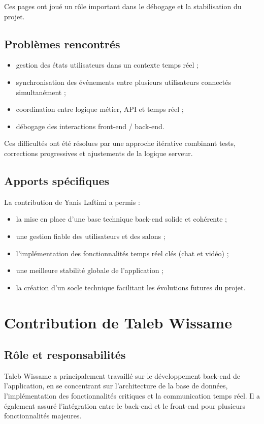 \documentclass[12pt,a4paper]{report}
\begin{document}
Ces pages ont joué un rôle important dans le débogage et la stabilisation du projet.

\subsection*{Problèmes rencontrés}

\begin{itemize}
  \item gestion des états utilisateurs dans un contexte temps réel ;
  \item synchronisation des événements entre plusieurs utilisateurs connectés simultanément ;
  \item coordination entre logique métier, API et temps réel ;
  \item débogage des interactions front-end / back-end.
\end{itemize}

Ces difficultés ont été résolues par une approche itérative combinant tests, corrections progressives et ajustements de la logique serveur.

\subsection*{Apports spécifiques}

La contribution de Yanis Laftimi a permis :
\begin{itemize}
  \item la mise en place d’une base technique back-end solide et cohérente ;
  \item une gestion fiable des utilisateurs et des salons ;
  \item l’implémentation des fonctionnalités temps réel clés (chat et vidéo) ;
  \item une meilleure stabilité globale de l’application ;
  \item la création d’un socle technique facilitant les évolutions futures du projet.
\end{itemize}
\section{Contribution de Taleb Wissame}

\subsection*{Rôle et responsabilités}

Taleb Wissame a principalement travaillé sur le développement back-end de l'application, en se concentrant sur l'architecture de la base de données, l'implémentation des fonctionnalités critiques et la communication temps réel. Il a également assuré l'intégration entre le back-end et le front-end pour plusieurs fonctionnalités majeures.
\end{document}
